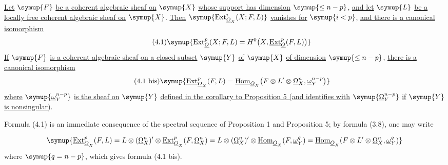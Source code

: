  \uline{Let} $\symup{F}$ \uline{be a coherent algebraic sheaf on} $\symup{X}$ \uline{whose support
has dimension} $\symup{\leq n-p}$, \uline{and let} $\symup{L}$ \uline{be a locally free coherent algebraic sheaf
on} $\symup{X}$. \uline{Then} $\symup{\operatorname{Ext}_{\Osh_X}^{i}(X;F,L)}$ \uline{vanishes for} $\symup{i<p}$, \uline{and
there is a canonical isomorphism}
\begin{equation}\tag{4.1}
  \symup{\operatorname{Ext}_{\Osh}^{p}(X;F,L)
  =H^{0}\bigl(X,\Extsh_{\Osh}^{p}(F,L)\bigr)}
\end{equation}
\uline{If} $\symup{F}$ \uline{is a coherent algebraic sheaf on a closed subset} $\symup{Y}$ \uline{of} $\symup{X}$ \uline{of dimension}
$\symup{\leq n-p}$, \uline{there is a canonical isomorphism}
\begin{equation}\tag{4.1 bis}
  \symup{\Extsh_{\Osh_X}^{p}(F,L)
  =\Homsh_{\Osh_X}\!\left(
    F\otimes L'\otimes\underline{\Omega}_X^{n},\underline{\omega}_Y^{n-p}
  \right)}
\end{equation}
\uline{where} $\symup{\underline{\omega}_Y^{n-p}}$ \uline{is the sheaf on} $\symup{Y}$ \uline{defined in the corollary to
Proposition 5 (and identifies with} $\symup{\underline{\Omega}_Y^{n-p}}$ \uline{if} $\symup{Y}$ \uline{is nonsingular}).

Formula (4.1) is an immediate consequence of the spectral sequence of
Proposition 1 and Proposition 5; by formula (3.8), one may write

\[
\symup{\Extsh_{\Osh_X}^{p}(F,L)
=L\otimes(\underline{\Omega}_X^{n})'\otimes
  \Extsh_{\Osh_X}^{p}(F,\underline{\Omega}_X^{n})
=L\otimes(\underline{\Omega}_X^{n})'\otimes
  \Homsh_{\Osh_X}(F,\underline{\omega}_Y^{q})
=\Homsh_{\Osh_X}\!\left(
  F\otimes L'\otimes\underline{\Omega}_X^{n},\underline{\omega}_Y^{q}\right)}
\]
where $\symup{q=n-p}$, which gives formula (4.1 bis).

